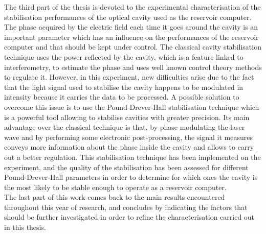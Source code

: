 The third part of the thesis is devoted to the experimental characterisation of the stabilisation performances of the optical cavity used as the reservoir computer. The phase acquired by the electric field each time it goes around the cavity is an important parameter which has an influence on the performances of the reservoir computer and that should be kept under control. The classical cavity stabilisation technique uses the power reflected by the cavity, which is a feature linked to interferometry, to estimate the phase and uses well known control theory methods to regulate it. However, in this experiment, new difficulties arise due to the fact that the light signal used to stabilise the cavity happens to be modulated in intensity because it carries the data to be processed. A possible solution to overcome this issue is to use the Pound-Drever-Hall stabilisation technique which is a powerful tool allowing to stabilise cavities with greater precision. Its main advantage over the classical technique is that, by phase modulating the laser wave and by performing some electronic post-processing, the signal it measures conveys more information about the phase inside the cavity and allows to carry out a better regulation. This stabilisation technique has been implemented on the experiment, and the quality of the stabilisation has been assessed for different Pound-Drever-Hall parameters in order to determine for which ones the cavity is the most likely to be stable enough to operate as a reservoir computer.\\


The last part of this work comes back to the main results encountered throughout this year of research, and concludes by indicating the factors that should be further investigated in order to refine the characterisation carried out in this thesis.






